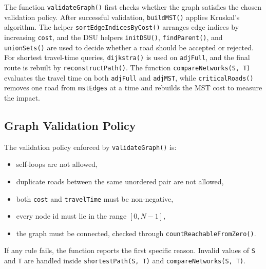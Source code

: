\documentclass[10pt,a4paper]{article}
\begin{document}
The function \texttt{validateGraph()} first checks whether the graph satisfies the chosen validation policy. After successful validation, \texttt{buildMST()} applies Kruskal's algorithm. The helper \texttt{sortEdgeIndicesByCost()} arranges edge indices by increasing \texttt{cost}, and the DSU helpers \texttt{initDSU()}, \texttt{findParent()}, and \texttt{unionSets()} are used to decide whether a road should be accepted or rejected. For shortest travel-time queries, \texttt{dijkstra()} is used on \texttt{adjFull}, and the final route is rebuilt by \texttt{reconstructPath()}. The function \texttt{compareNetworks(S, T)} evaluates the travel time on both \texttt{adjFull} and \texttt{adjMST}, while \texttt{criticalRoads()} removes one road from \texttt{mstEdges} at a time and rebuilds the MST cost to measure the impact.

\subsection{Graph Validation Policy}
The validation policy enforced by \texttt{validateGraph()} is:
\begin{itemize}
    \item self-loops are not allowed,
    \item duplicate roads between the same unordered pair are not allowed,
    \item both \texttt{cost} and \texttt{travelTime} must be non-negative,
    \item every node id must lie in the range \([0, N-1]\),
    \item the graph must be connected, checked through \texttt{countReachableFromZero()}.
\end{itemize}
If any rule fails, the function reports the first specific reason. Invalid values of \texttt{S} and \texttt{T} are handled inside \texttt{shortestPath(S, T)} and \texttt{compareNetworks(S, T)}.
\end{document}
